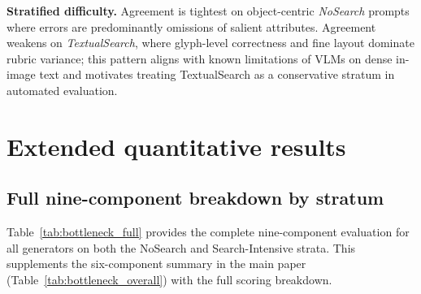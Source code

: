 \textbf{Stratified difficulty.}
Agreement is tightest on object-centric \emph{NoSearch} prompts where errors are predominantly omissions of salient attributes.
Agreement weakens on \emph{TextualSearch}, where glyph-level correctness and fine layout dominate rubric variance; this pattern aligns with known limitations of VLMs on dense in-image text and motivates treating TextualSearch as a conservative stratum in automated evaluation.

\section{Extended quantitative results}
\label{app:extended_quant}

\subsection{Full nine-component breakdown by stratum}
\label{app:full_component_breakdown}

Table~\ref{tab:bottleneck_full} provides the complete nine-component evaluation for all generators on both the NoSearch and Search-Intensive strata.
This supplements the six-component summary in the main paper (Table~\ref{tab:bottleneck_overall}) with the full scoring breakdown.

